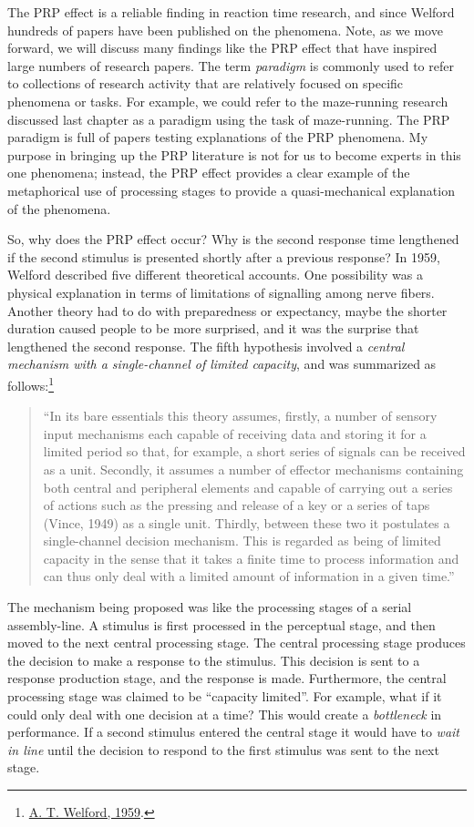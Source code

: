 \documentclass[
  oneside,
  12pt]{crumpbook}
\begin{document}
The PRP effect is a reliable finding in reaction time research, and since Welford hundreds of papers have been published on the phenomena. Note, as we move forward, we will discuss many findings like the PRP effect that have inspired large numbers of research papers. The term \emph{paradigm} is commonly used to refer to collections of research activity that are relatively focused on specific phenomena or tasks. For example, we could refer to the maze-running research discussed last chapter as a paradigm using the task of maze-running. The PRP paradigm is full of papers testing explanations of the PRP phenomena. My purpose in bringing up the PRP literature is not for us to become experts in this one phenomena; instead, the PRP effect provides a clear example of the metaphorical use of processing stages to provide a quasi-mechanical explanation of the phenomena.

So, why does the PRP effect occur? Why is the second response time lengthened if the second stimulus is presented shortly after a previous response? In 1959, Welford described five different theoretical accounts. One possibility was a physical explanation in terms of limitations of signalling among nerve fibers. Another theory had to do with preparedness or expectancy, maybe the shorter duration caused people to be more surprised, and it was the surprise that lengthened the second response. The fifth hypothesis involved a \emph{central mechanism with a single-channel of limited capacity}, and was summarized as follows:\footnote{\protect\hyperlink{ref-welfordEvidenceSinglechannelDecision1959}{A. T. Welford, 1959}.}

\begin{quote}
``In its bare essentials this theory assumes, firstly, a number of sensory input mechanisms each capable of receiving data and storing it for a limited period so that, for example, a short series of signals can be received as a unit. Secondly, it assumes a number of effector mechanisms containing both central and peripheral elements and capable of carrying out a series of actions such as the pressing and release of a key or a series of taps (Vince, 1949) as a single unit. Thirdly, between these two it postulates a single-channel decision mechanism. This is regarded as being of limited capacity in the sense that it takes a finite time to process information and can thus only deal with a limited amount of information in a given time.''
\end{quote}

The mechanism being proposed was like the processing stages of a serial assembly-line. A stimulus is first processed in the perceptual stage, and then moved to the next central processing stage. The central processing stage produces the decision to make a response to the stimulus. This decision is sent to a response production stage, and the response is made. Furthermore, the central processing stage was claimed to be ``capacity limited''. For example, what if it could only deal with one decision at a time? This would create a \emph{bottleneck} in performance. If a second stimulus entered the central stage it would have to \emph{wait in line} until the decision to respond to the first stimulus was sent to the next stage.
\end{document}
